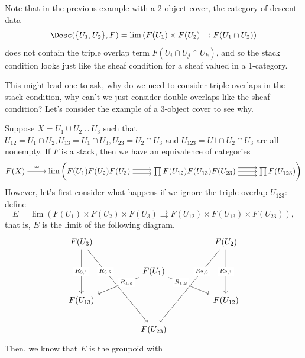 \begin{remark}
Note that in the previous example with a 2-object cover, the category of descent data
$$
\Desc(\{ U_1, U_2\}, F) = \lim \left(F(U_1) \times F(U_2) \rightrightarrows F(U_1 \cap U_2) \right)
$$
does not contain the triple overlap term $F(U_i \cap U_j \cap U_k)$, and so the stack condition looks just like the sheaf condition for a sheaf valued in a 1-category.
\end{remark}
\begin{question}
This might lead one to ask, why do we need to consider triple overlaps in the stack condition, why can't we just consider double overlaps like the sheaf condition? Let's consider the example of a 3-object cover to see why.
\end{question}
\begin{example}
Suppose \( X = U_1 \cup U_2 \cup U_3 \) such that \( U_{12} = U_1 \cap U_2, U_{13} = U_1 \cap U_3, U_{23} = U_2 \cap U_3 \text{ and } U_{123} = U1 \cap U_2 \cap U_3 \) are all nonempty. If \( F \) is a stack, then we have an equivalence of categories
\[\begin{tikzcd}[cramped]
	{F(X)} & {\lim \bigg( F(U_1)F(U_2)F(U_3)} & {\prod F(U_{12}) F(U_{13}) F(U_{23})} & {\prod F(U_{123}) \bigg)}
	\arrow["\cong", from=1-1, to=1-2]
	\arrow[shift right, from=1-2, to=1-3]
	\arrow[shift left, from=1-2, to=1-3]
	\arrow[from=1-3, to=1-4]
	\arrow[shift left=2, from=1-3, to=1-4]
	\arrow[shift right=2, from=1-3, to=1-4]
\end{tikzcd}\]
However, let's first consider what happens if we ignore the triple overlap \( U_{123} \): define
\[ E = \lim\left( F(U_1) \times F(U_2) \times F(U_3) \rightrightarrows F(U_{12}) \times F(U_{13}) \times F(U_{23}) \right), \]
that is, \( E \) is the limit of the following diagram.
\[\begin{tikzcd}
	{F(U_3)} &&&& {F(U_2)} \\
	&& {F(U_1)} \\
	{F(U_{13})} &&&& {F(U_{12})} \\
	&& {F(U_{23})}
	\arrow["{R_{3,1}}"{description}, from=1-1, to=3-1]
	\arrow["{R_{3,2}}"{description, pos=0.3}, from=1-1, to=4-3]
	\arrow["{R_{2,3}}"{description, pos=0.3}, from=1-5, to=4-3]
	\arrow["{R_{1,3}}"{description, pos=0.3}, from=2-3, to=3-1]
	\arrow["{R_{1,2}}"{description, pos=0.3}, from=2-3, to=3-5]
    \arrow["{R_{2,1}}"{description}, from=1-5,to=3-5]
\end{tikzcd}\]
Then, we know that \( E \) is the groupoid with
\begin{enumerate}

\end{enumerate}
\end{example}
